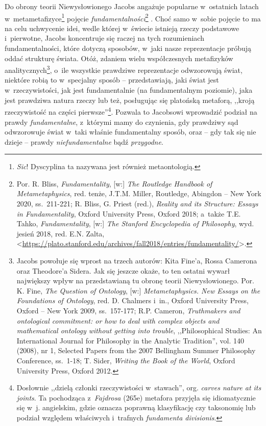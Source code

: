 Do obrony teorii Niewysłowionego Jacobs angażuje popularne w~ostatnich latach w~metametafizyce\footnote{\textit{Sic}! Dyscyplina ta nazywana jest również metaontologią.} pojęcie \textit{fundamentalności}\footnote{Por. R. Bliss, \textit{Fundamentality}, [w:] \textit{The Routledge Handbook of Metametaphysics}, red. tenże, J.T.M. Miller, Routledge, Abingdon -- New York 2020, ss.~211-221; R. Bliss, G. Priest (red.), \textit{Reality and its Structure: Essays in Fundamentality}, Oxford University Press, Oxford 2018; a~także T.E. Tahko, \textit{Fundamentality}, [w:] \textit{The Stanford Encyclopedia of Philosophy}, wyd. jesień 2018, red. E.N. Zalta, {\textless}\url{https://plato.stanford.edu/archives/fall2018/entries/fundamentality/}{\textgreater}.}
. Choć samo w~sobie pojęcie to ma na celu uchwycenie idei, wedle której w~świecie istnieją rzeczy podstawowe i~pierwotne, Jacobs koncentruje się raczej na tych rozumieniach fundamentalności, które dotyczą sposobów, w~jaki nasze reprezentacje próbują oddać strukturę świata. Otóż, zdaniem wielu współczesnych metafizyków analitycznych\footnote{Jacobs powołuje się wprost na trzech autorów: Kita Fine'a, Rossa Camerona oraz Theodore'a Sidera. Jak się jeszcze okaże, to ten ostatni wywarł największy wpływ na przedstawianą tu obronę teorii Niewysłowionego. Por. K. Fine, \textit{The Question of Ontology}, [w:] \textit{Metametaphysics. New Essays on the Foundations of Ontology}, red. D. Chalmers i~in., Oxford University Press, Oxford -- New York 2009, ss.~157-177; R.P. Cameron, \textit{Truthmakers and ontological commitment: or how to deal with complex objects and mathematical ontology without getting into trouble}, ,,Philosophical Studies: An International Journal for Philosophy in the Analytic Tradition'', vol. 140 (2008), nr 1, Selected Papers from the 2007 Bellingham Summer Philosophy Conference, ss.~1-18; T. Sider, \textit{Writing the Book of the World}, Oxford University Press, Oxford 2012.}, o~ile wszystkie prawdziwe reprezentacje odwzorowują świat, niektóre robią to w~specjalny sposób -- przedstawiają, jaki świat jest w~rzeczywistości, jak jest fundamentalnie (na fundamentalnym poziomie), jaka jest prawdziwa natura rzeczy lub też, posługując się platońską metaforą, ,,kroją rzeczywistość na części pierwsze''\footnote{Dosłownie ,,dzielą członki rzeczywistości w~stawach'', org. \textit{carves nature at its joints}. Ta pochodząca z~\textit{Fajdrosa} (265e) metafora przyjęła się idiomatycznie się w~j. angielskim, gdzie oznacza poprawną klasyfikację czy taksonomię lub podział względem właściwych i~trafnych \textit{fundamenta divisionis}.}. Pozwala to Jacobsowi wprowadzić podział na prawdy \textit{fundamentalne}, z~którymi mamy do czynienia, gdy prawdziwy sąd odwzorowuje świat w~taki właśnie fundamentalny sposób, oraz -- gdy tak się nie dzieje -- prawdy \textit{niefundamentalne} bądź \textit{przygodne}.

